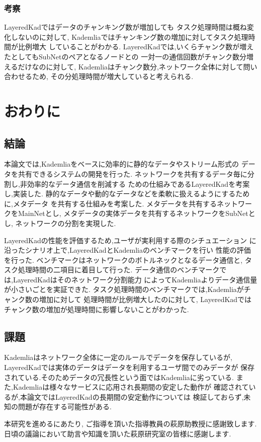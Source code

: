 \documentclass[sotsuron]{jcsie}
\begin{document}
\subsection{考察}
LayeredKadではデータのチャンキング数が増加しても
タスク処理時間は概ね変化しないのに対して,
Kademliaではチャンキング数の増加に対してタスク処理時間が比例増大
していることがわかる.
LayeredKadでは,いくらチャンク数が増えたとしてもSubNetのペアとなるノードとの
一対一の通信回数がチャンク数分増えるだけなのに対して,
Kademliaはチャンク数分,ネットワーク全体に対して問い合わせるため,
その分処理時間が増大していると考えられる.


\chapter{おわりに}
\section{結論}
本論文では,Kademliaをベースに効率的に静的なデータやストリーム形式の
データを共有できるシステムの開発を行った.
ネットワークを共有するデータ毎に分割し,非効率的なデータ通信を削減する
ための仕組みであるLayeredKadを考案し,実装した.
静的なデータや動的なデータなどを柔軟に扱えるようにするために,メタデータ
を共有する仕組みを考案した.
メタデータを共有するネットワークをMainNetとし,
メタデータの実体データを共有するネットワークをSubNetとし,
ネットワークの分割を実現した.

LayeredKadの性能を評価するため,ユーザが実利用する際のシチュエーション
に沿ったシナリオ上で,LayeredKadとKademliaのベンチマークを行い
性能の評価を行った.
ベンチマークはネットワークのボトルネックとなるデータ通信と,
タスク処理時間の二項目に着目して行った.
データ通信のベンチマークでは,LayeredKadはそのネットワーク分割能力
によってKademliaよりデータ通信量が小さいごとを実証できた.
タスク処理時間のベンチマークでは,Kademliaがチャンク数の増加に対して
処理時間が比例増大したのに対して,
LayeredKadではチャンク数の増加が処理時間に影響しないことがわかった.

\section{課題}
Kademliaはネットワーク全体に一定のルールでデータを保存しているが,
LayeredKadでは実体のデータはデータを利用するユーザ間でのみデータが
保存されている.そのためデータの冗長性という面ではKademliaに劣っている.
また,Kademliaは様々なサービスに応用され長期間の安定した動作が
確認されているが,本論文ではLayeredKadの長期間の安定動作については
検証しておらず,未知の問題が存在する可能性がある.

\begin{acknowledgment}
	本研究を進めるにあたり, ご指導を頂いた指導教員の萩原助教授に感謝致します.
	日頃の議論において助言や知識を頂いた萩原研究室の皆様に感謝します.
\end{acknowledgment}



\end{document}
